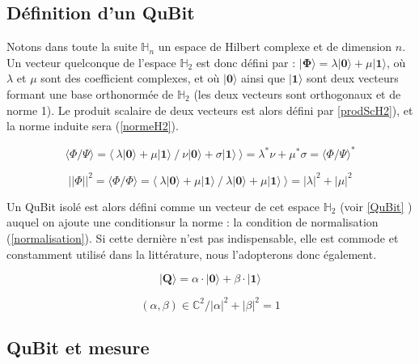\documentclass[a4paper,12pt]{report}
\newcommand{\prodSc}[2]{\langle #1 / #2 \rangle}
\newcommand{\quSt}[1]{\bm{|#1\rangle}}
\begin{document}
		\subsection{Définition d'un QuBit}

\par{
	Notons dans toute la suite $\mathbb{H}_{n}$ un espace de Hilbert complexe et de dimension $n$. Un vecteur quelconque de l'espace $\mathbb{H}_{2}$ est donc défini par : $\quSt{\Phi} = \lambda \quSt{0} + \mu \quSt{1}$, où $\lambda$ et $\mu$ sont des coefficient complexes, et où $\quSt{0}$ ainsi que $\quSt{1} $ sont deux vecteurs formant une base orthonormée de $\mathbb{H}_{2}$ (les deux vecteurs sont orthogonaux et de norme 1). Le produit scalaire de deux vecteurs est alors défini par \ref{prodScH2}), et la norme induite sera (\ref{normeH2}).
}

\begin{equation} \label{prodScH2}
	 \prodSc{\Phi}{\Psi} = \langle ~ \lambda \quSt{0} + \mu \quSt{1} ~/~ \nu \quSt{0} + \sigma \quSt{1} ~\rangle = \lambda^* \nu + \mu^* \sigma = \prodSc{\Phi}{\Psi}^*
\end{equation}

\begin{equation} \label{normeH2}
	 || \Phi ||^2 = \prodSc{\Phi}{\Phi} = \langle ~ \lambda \quSt{0} + \mu \quSt{1} ~/~ \lambda \quSt{0} + \mu \quSt{1} ~\rangle = |\lambda|^2 + |\mu|^2
\end{equation}

\vspace{1\baselineskip}

\par{
	Un QuBit isolé est alors défini comme un vecteur de cet espace $\mathbb{H}_{2}$ (voir \ref{QuBit} ) auquel on ajoute une conditionsur la norme : la condition de normalisation (\ref{normalisation}). Si cette dernière n'est pas indispensable, elle est commode et constamment utilisé dans la littérature, nous l'adopterons donc également.
}

\begin{equation} \label{QuBit}
	\quSt{Q} = \alpha \cdot \quSt{0} + \beta \cdot \quSt{1}
\end{equation}

\begin{equation} \label{normalisation}
	(\alpha,\beta) \in \mathbb{C}^2 / |\alpha|^2 + |\beta|^2 = 1
\end{equation}

		\subsection{QuBit et mesure}
\end{document}
